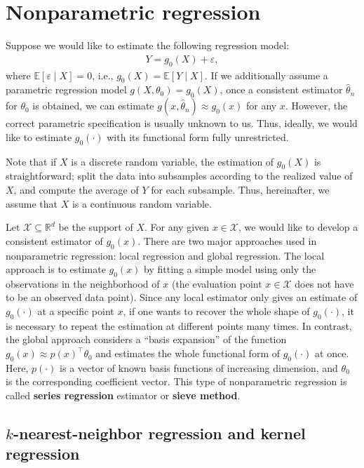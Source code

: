 \documentclass[10.5pt, A4paper, openany, uplatex]{book}
\newcommand{\mcl}{\mathcal}
\newcommand{\eps}{\varepsilon}
\newcommand{\E}{\mathbb{E}}
\renewcommand{\hat}{\widehat}
\numberwithin{equation}{section}
\begin{document}
\section{Nonparametric regression}

Suppose we would like to estimate the following regression model:
\begin{align}\label{eq:nonpara}
	Y = g_0(X) + \eps,
\end{align}
where $\E[\eps \mid X] = 0$, i.e., $g_0(X) = \E[Y \mid X]$.
If we additionally assume a parametric regression model $g(X, \theta_0) = g_0(X)$, once a consistent estimator $\hat \theta_n$ for $\theta_0$ is obtained, we can estimate $g(x, \hat \theta_n) \approx g_0(x)$ for any $x$.
However, the correct parametric specification is usually unknown to us.
Thus, ideally, we would like to estimate $g_0(\cdot)$ with its functional form fully unrestricted.

Note that if $X$ is a discrete random variable, the estimation of $g_0(X)$ is straightforward; split the data into subsamples according to the realized value of $X$, and compute the average of $Y$ for each subsample.
Thus, hereinafter, we assume that $X$ is a continuous random variable.

\bigskip

Let $\mcl{X} \subseteq \mathbb{R}^d$ be the support of $X$.
For any given $x \in \mcl{X}$, we would like to develop a consistent estimator of $g_0(x)$.
There are two major approaches used in nonparametric regression: local regression and global regression.
The local approach is to estimate $g_0(x)$ by fitting a simple model using only the observations in the neighborhood of $x$ (the evaluation point $x \in \mcl{X}$ does not have to be an observed data point).
Since any local estimator only gives an estimate of $g_0(\cdot)$ at a specific point $x$, if one wants to recover the whole shape of $g_0(\cdot)$, it is necessary to repeat the estimation at different points many times.
In contrast, the global approach considers a ``basis expansion'' of the function $g_0(x)\approx p(x)^\top \theta_0$ and estimates the whole functional form of $g_0(\cdot)$ at once.
Here, $p(\cdot)$ is a vector of known basis functions of increasing dimension, and $\theta_0$ is the corresponding coefficient vector.
This type of nonparametric regression is called \textbf{series regression} estimator or \textbf{sieve method}.

\subsection{$k$-nearest-neighbor regression and kernel regression}\label{subsec:kernel}
\end{document}
